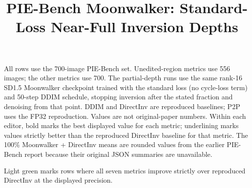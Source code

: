 \documentclass[10pt]{article}
\title{PIE-Bench Moonwalker: Standard-Loss Near-Full Inversion Depths}
\date{}
\begin{document}
\maketitle
\noindent All rows use the 700-image PIE-Bench set. Unedited-region metrics use 556 images; the other metrics use 700. The partial-depth runs use the same rank-16 SD1.5 Moonwalker checkpoint trained with the standard loss (no cycle-loss term) and 50-step DDIM schedule, stopping inversion after the stated fraction and denoising from that point. DDIM and DirectInv are reproduced baselines; P2P uses the FP32 reproduction. Values are not original-paper numbers. Within each editor, bold marks the best displayed value for each metric; underlining marks values strictly better than the reproduced DirectInv baseline for that metric. The 100\% Moonwalker + DirectInv means are rounded values from the earlier PIE-Bench report because their original JSON summaries are unavailable.
\par\noindent Light green marks rows where all seven metrics improve strictly over reproduced DirectInv at the displayed precision.
\par\medskip
\end{document}
